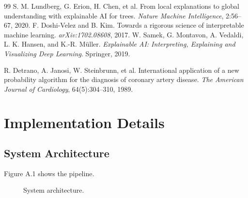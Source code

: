 \documentclass[12pt, a4paper, oneside]{book}
\begin{document}
\begin{thebibliography}{99}
 S. M. Lundberg, G. Erion, H. Chen, et al. From local explanations to global understanding with explainable AI for trees. \textit{Nature Machine Intelligence}, 2:56--67, 2020.
 F. Doshi-Velez and B. Kim. Towards a rigorous science of interpretable machine learning. \textit{arXiv:1702.08608}, 2017.
 W. Samek, G. Montavon, A. Vedaldi, L. K. Hansen, and K.-R. M{\"u}ller. \textit{Explainable AI: Interpreting, Explaining and Visualizing Deep Learning}. Springer, 2019.

 R. Detrano, A. Janosi, W. Steinbrunn, et al. International application of a new probability algorithm for the diagnosis of coronary artery disease. \textit{The American Journal of Cardiology}, 64(5):304--310, 1989.
\end{thebibliography}

\appendix
\chapter{Implementation Details}

\section{System Architecture}
Figure A.1 shows the pipeline.

\begin{figure}[htbp]
\centering
{}
\caption{System architecture.}
\label{fig:system_arch}
\end{figure}
\end{document}
